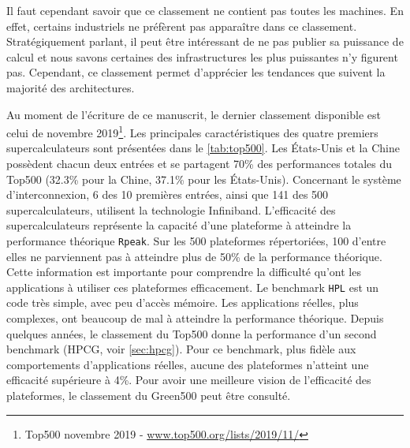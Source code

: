         Il faut cependant savoir que ce classement ne contient pas toutes les machines. En effet, certains industriels ne préfèrent pas apparaître dans ce classement. Stratégiquement parlant, il peut être intéressant de ne pas publier sa puissance de calcul et nous savons certaines des infrastructures les plus puissantes n'y figurent pas. Cependant, ce classement permet d'apprécier les tendances que suivent la majorité des architectures.
        
        Au moment de l'écriture de ce manuscrit, le dernier classement disponible est celui de novembre 2019\footnote{Top500 novembre 2019 -  \url{www.top500.org/lists/2019/11/}}. Les principales caractéristiques des quatre premiers supercalculateurs sont présentées dans le \autoref{tab:top500}. Les États-Unis et la Chine possèdent chacun deux entrées et se partagent 70\% des performances totales du Top500 (32.3\% pour la Chine, 37.1\% pour les États-Unis). Concernant le système d'interconnexion, 6 des 10 premières entrées, ainsi que 141 des 500 supercalculateurs,  utilisent la technologie Infiniband.
        L'efficacité des supercalculateurs représente la capacité d'une plateforme à atteindre la performance théorique \verb|Rpeak|. Sur les 500 plateformes répertoriées, 100 d'entre elles ne parviennent pas à atteindre plus de 50\% de la performance théorique. Cette information est importante pour comprendre la difficulté qu'ont les applications à utiliser ces plateformes efficacement. Le benchmark \verb|HPL| est un code très simple, avec peu d'accès mémoire. Les applications réelles, plus complexes, ont beaucoup de mal à atteindre la performance théorique. Depuis quelques années, le classement du Top500 donne la performance d'un second benchmark (HPCG, voir \autoref{sec:hpcg}). Pour ce benchmark, plus fidèle aux comportements d'applications réelles, aucune des plateformes n'atteint une efficacité supérieure à 4\%. Pour avoir une meilleure vision de l'efficacité des plateformes, le classement du Green500 peut être consulté.


